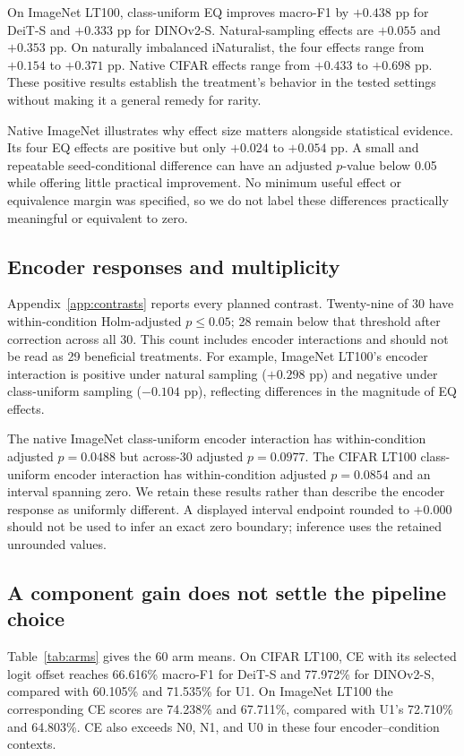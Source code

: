 \documentclass[conference]{IEEEtran}
\begin{document}
On ImageNet LT100, class-uniform EQ improves macro-F1 by $+0.438$ pp for DeiT-S and $+0.333$ pp for DINOv2-S. Natural-sampling effects are $+0.055$ and $+0.353$ pp. On naturally imbalanced iNaturalist, the four effects range from $+0.154$ to $+0.371$ pp. Native CIFAR effects range from $+0.433$ to $+0.698$ pp. These positive results establish the treatment's behavior in the tested settings without making it a general remedy for rarity.

Native ImageNet illustrates why effect size matters alongside statistical evidence. Its four EQ effects are positive but only $+0.024$ to $+0.054$ pp. A small and repeatable seed-conditional difference can have an adjusted $p$-value below 0.05 while offering little practical improvement. No minimum useful effect or equivalence margin was specified, so we do not label these differences practically meaningful or equivalent to zero.

\subsection{Encoder responses and multiplicity}
Appendix~\ref{app:contrasts} reports every planned contrast. Twenty-nine of 30 have within-condition Holm-adjusted $p\leq0.05$; 28 remain below that threshold after correction across all 30. This count includes encoder interactions and should not be read as 29 beneficial treatments. For example, ImageNet LT100's encoder interaction is positive under natural sampling ($+0.298$ pp) and negative under class-uniform sampling ($-0.104$ pp), reflecting differences in the magnitude of EQ effects.

The native ImageNet class-uniform encoder interaction has within-condition adjusted $p=0.0488$ but across-30 adjusted $p=0.0977$. The CIFAR LT100 class-uniform encoder interaction has within-condition adjusted $p=0.0854$ and an interval spanning zero. We retain these results rather than describe the encoder response as uniformly different. A displayed interval endpoint rounded to $+0.000$ should not be used to infer an exact zero boundary; inference uses the retained unrounded values.

\subsection{A component gain does not settle the pipeline choice}
Table~\ref{tab:arms} gives the 60 arm means. On CIFAR LT100, CE with its selected logit offset reaches 66.616\% macro-F1 for DeiT-S and 77.972\% for DINOv2-S, compared with 60.105\% and 71.535\% for U1. On ImageNet LT100 the corresponding CE scores are 74.238\% and 67.711\%, compared with U1's 72.710\% and 64.803\%. CE also exceeds N0, N1, and U0 in these four encoder--condition contexts.
\end{document}
